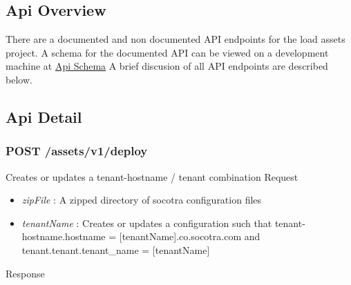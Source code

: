 \hypertarget{api-overview}{%
\subsection{Api Overview}\label{api-overview}}

There are a documented and non documented API endpoints for the load
assets project. A schema for the documented API can be viewed on a
development machine at \href{http://localhost:5000/api/swagger.json}{Api
Schema} A brief discusion of all API endpoints are described below.

\hypertarget{api-detail}{%
\subsection{Api Detail}\label{api-detail}}

\hypertarget{post-assetsv1deploy}{%
\subsubsection{POST /assets/v1/deploy}\label{post-assetsv1deploy}}

Creates or updates a tenant-hostname / tenant combination Request

\begin{Shaded}
\begin{Highlighting}[]
\FunctionTok{\{}
    \FunctionTok{:} \FunctionTok{,}
    \FunctionTok{:} 
\FunctionTok{\}}
\end{Highlighting}
\end{Shaded}

\begin{itemize}
\tightlist
\item
  \emph{zipFile} : A zipped directory of socotra configuration files
\item
  \emph{tenantName} : Creates or updates a configuration such that
  tenant-hostname.hostname = {[}tenantName{]}.co.socotra.com and
  tenant.tenant.tenant\_name = {[}tenantName{]}
\end{itemize}

Response

\begin{Shaded}
\begin{Highlighting}[]
\FunctionTok{\{}
    \FunctionTok{:} \FunctionTok{,}
    \FunctionTok{:} \FunctionTok{,}
    \FunctionTok{:} 
\FunctionTok{\}}
\end{Highlighting}
\end{Shaded}

